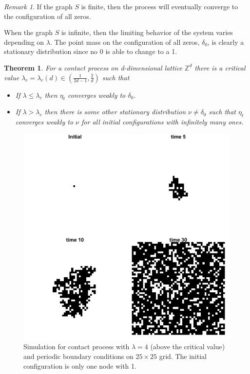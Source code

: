 \documentclass{article}
\theoremstyle{plain}
\newtheorem{theorem}{Theorem}[section]
\theoremstyle{definition}
\theoremstyle{remark}
\newtheorem*{remark}{Remark}
\numberwithin{equation}{section}
\newcommand{\Z}{\mathbb{Z}}
\begin{document}
\begin{remark}
If the graph $S$ is finite, then the process will eventually converge to the configuration of all zeros.
\end{remark}

When the graph $S$ is infinite, then the limiting behavior of the system varies depending on $\lambda$.
The point mass on the configuration of all zeros, $\delta_0$, is clearly a stationary distribution since no 0 is able to change to a 1.

\begin{theorem} \cite{Liggett2002}
For a contact process on d-dimensional lattice $\Z^d$ there is a critical value $\lambda_c = \lambda_c(d) \in \left( \frac{1}{2d - 1}, \frac{2}{d} \right)$ such that
\begin{itemize}
    \item If $\lambda \leq \lambda_c$ then $\eta_t$ converges weakly to $\delta_0$. %
    \item If $\lambda > \lambda_c$ then there is some other stationary distribution $\nu \not = \delta_0$ such that $\eta_t$ converges weakly to $\nu$ for all initial configurations with infinitely many ones.
\end{itemize}
\end{theorem}

\begin{figure}[H]
  \centering
    \includegraphics[width=.80\textwidth]{figures/contact_simulation_torus_25.png}
   \caption{Simulation for contact process with $\lambda = 4$ (above the critical value) and periodic boundary conditions on $25 \times 25$ grid. The initial configuration is only one node with 1.}
  \label{fig:contact_sim_torus_above_crit.png}
\end{figure}
\end{document}
